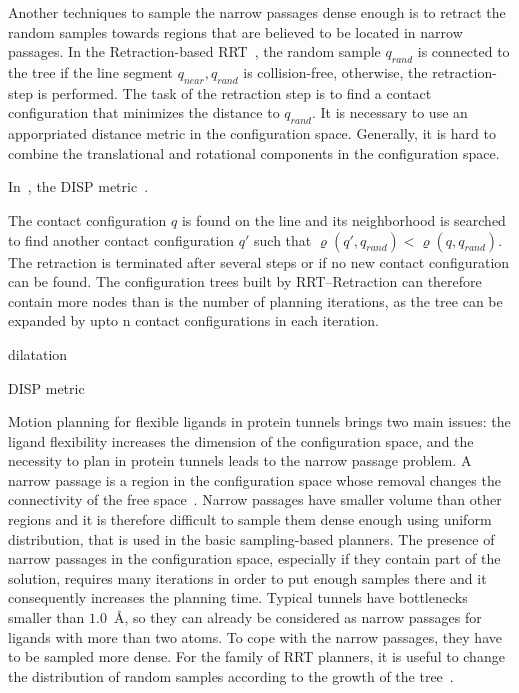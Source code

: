 \documentclass[letterpaper, 10 pt, conference]{ieeeconf} %
\def\qrand{q_{rand}}
\def\qnear{q_{near}}
\begin{document}
Another techniques to sample the narrow passages dense enough is to retract the random samples towards regions that are believed
to be located in narrow passages.
In the Retraction-based RRT~\cite{zhangRetraction}, the random sample $\qrand$ is connected to the tree if the line segment $\qnear,\qrand$ is collision-free, otherwise, the retraction-step is performed.
The task of the retraction step is to find a contact configuration  that minimizes the distance to $\qrand$.
It is necessary to use an apporpriated distance metric in the configuration space.
Generally, it is hard to combine the translational and rotational components in the configuration space.

In~\cite{zhangRetraction}, the DISP metric~\cite{zhang2008fast}.

The contact configuration $q$ is found on the line and its neighborhood is searched to find another contact configuration $q'$ such that 
$\varrho(q',\qrand) < \varrho(q,\qrand)$.
The retraction is terminated after several steps or if no new contact configuration can be found.
The configuration trees built by RRT--Retraction can therefore contain more nodes than is the number of planning iterations,
as the tree can be expanded by upto n contact configurations in each iteration.

\cite{zhangRetraction}

\cite{amatoOBRRT}

dilatation
\cite{hsu06multilevel}


\cite{saha2005finding}

DISP metric 
\cite{zhang2008fast}



Motion planning for flexible ligands in protein tunnels brings two main issues: 
the ligand flexibility increases the dimension of the configuration space, and the necessity to plan in protein tunnels
leads to the narrow passage problem.
A narrow passage is a region in the configuration space whose removal changes the connectivity of the free space~\cite{hannaWIS}.
Narrow passages have smaller volume than other regions and it is therefore difficult to sample them dense enough using uniform distribution, that is used in the basic sampling-based planners.
The presence of narrow passages in the configuration space, especially if they contain part of the solution, requires many iterations
in order to put enough samples there and it consequently increases the planning time.
Typical tunnels have bottlenecks smaller than $1.0$~\AA, so they can already be considered as narrow passages for ligands with more than two atoms.
To cope with the narrow passages, they have to be sampled more dense.
For the family of RRT planners, it is useful to change the distribution of random samples according to the growth of the tree~\cite{vonasek2009rrt,vonasekphd,denny2016dynamic}.
\end{document}
